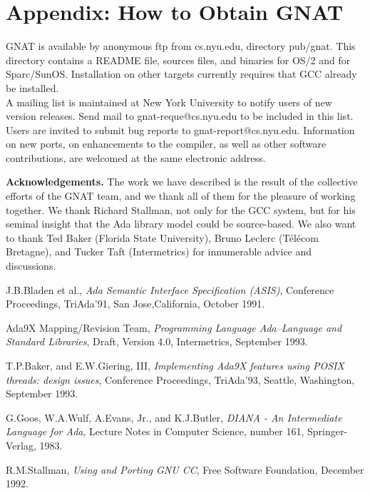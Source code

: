 \section{Appendix: How to Obtain GNAT}

GNAT is available by anonymous ftp from cs.nyu.edu, directory pub/gnat.
This directory contains a README file, sources files,  and binaries for
OS/2 and for Sparc/SunOS. Installation on other targets currently requires
that GCC already be installed.
\\
A mailing list is maintained at New York University
to notify users of new version releases. Send mail to gnat-reque@cs.nyu.edu
to be included in this list.
\\
Users are invited to submit bug reports to gnat-report@cs.nyu.edu. 
Information on new ports, on enhancements to the compiler, as well as
other software contributions, are welcomed at the same electronic address. 

\pagebreak

{\bf Acknowledgements.} The work we have described is the result of the
collective efforts of the GNAT team, and we thank all of them for the
pleasure of working together. We thank Richard Stallman, not only for the
GCC system, but for his seminal insight that the Ada library model could
be source-based. We also want to thank
Ted Baker (Florida State University), Bruno Leclerc (T\'el\'ecom
Bretagne), and Tucker Taft (Intermetrics) for innumerable 
advice and discussions. 

\begin{thebibliography}{10}

{\sc J.B.Bladen et al.}, {\it Ada Semantic Interface Specification (ASIS)},
Conference Proceedings,  TriAda'91, San Jose,California,  October 1991.

{\sc Ada9X Mapping/Revision Team}, {\it Programming Language
Ada--Language and Standard Libraries}, Draft, Version 4.0,
Intermetrics, September 1993.

{\sc T.P.Baker, and E.W.Giering, III}, {\it Implementing
Ada9X features using POSIX threads: design issues}, Conference
Proceedings, TriAda'93, Seattle, Washington, September 1993.

{\sc G.Goos, W.A.Wulf, A.Evans, Jr., and K.J.Butler}, {\it DIANA -
An Intermediate Language for Ada},
Lecture Notes in Computer Science, number 161, Springer-Verlag, 1983.


{\sc R.M.Stallman}, {\it Using and Porting GNU CC}, Free Software
Foundation, December 1992.


\end{thebibliography}





